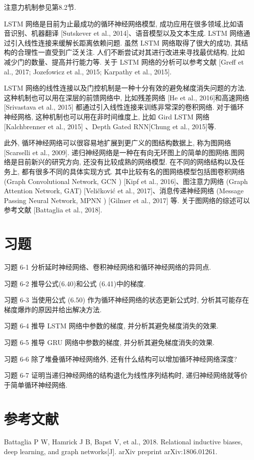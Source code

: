 \documentclass[10pt]{article}
\begin{document}
注意力机制参见第8.2节.

LSTM 网络是目前为止最成功的循环神经网络模型, 成功应用在很多领域,比如语音识别、机器翻译 [Sutskever et al., 2014]、语音模型以及文本生成. LSTM 网络通过引入线性连接来缓解长距离依赖问题. 虽然 LSTM 网络取得了很大的成功, 其结构的合理性一直受到广泛关注. 人们不断尝试对其进行改进来寻找最优结构, 比如减少门的数量、提高并行能力等. 关于 LSTM 网络的分析可以参考文献 [Greff et al., 2017; Jozefowicz et al., 2015; Karpathy et al., 2015].

LSTM 网络的线性连接以及门控机制是一种十分有效的避免梯度消失问题的方法. 这种机制也可以用在深层的前馈网络中, 比如残差网络 [He et al., 2016]和高速网络 [Srivastava et al., 2015] 都通过引入线性连接来训练非常深的卷积网络. 对于循环神经网格, 这种机制也可以用在非时间维度上, 比如 Gird LSTM 网络 [Kalchbrenner et al., 2015] 、Depth Gated RNN[Chung et al., 2015]等.

此外, 循环神经网络可以很容易地扩展到更广义的图结构数据上, 称为图网络[Scarselli et al., 2009]. 递归神经网络是一种在有向无环图上的简单的图网络.图网络是目前新兴的研究方向, 还没有比较成熟的网络模型. 在不同的网络结构以及任务上, 都有很多不同的具体实现方式. 其中比较有名的图网络模型包括图卷积网络 (Graph Convolutional Network, GCN ) [Kipf et al., 2016]、图注意力网络 (Graph Attention Network, GAT) [Veličković et al., 2017]、消息传递神经网络 (Message Passing Neural Network, MPNN ) [Gilmer et al., 2017] 等. 关于图网络的综述可以参考文献 [Battaglia et al., 2018].

\section*{习题}
习题 6-1 分析延时神经网络、卷积神经网络和循环神经网络的异同点.

习题 6-2 推导公式(6.40)和公式 (6.41)中的梯度.

习题 6-3 当使用公式 (6.50) 作为循环神经网络的状态更新公式时, 分析其可能存在梯度爆炸的原因并给出解决方法.

习题 6-4 推导 LSTM 网络中参数的梯度, 并分析其避免梯度消失的效果.

习题 6-5 推导 GRU 网络中参数的梯度, 并分析其避免梯度消失的效果.

习题 6-6 除了堆叠循环神经网络外, 还有什么结构可以增加循环神经网络深度?

习题 6-7 证明当递归神经网络的结构退化为线性序列结构时, 递归神经网络就等价于简单循环神经网络.

\section*{参考文献}
Battaglia P W, Hamrick J B, Bapst V, et al., 2018. Relational inductive biases, deep learning, and graph networks[J]. arXiv preprint arXiv:1806.01261.
\end{document}
